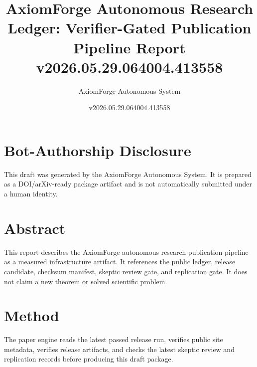 \documentclass[11pt]{article}
\title{AxiomForge Autonomous Research Ledger: Verifier-Gated Publication Pipeline Report v2026.05.29.064004.413558}
\author{AxiomForge Autonomous System}
\date{v2026.05.29.064004.413558}
\begin{document}
\maketitle

\section*{Bot-Authorship Disclosure}
This draft was generated by the AxiomForge Autonomous System. It is prepared as
a DOI/arXiv-ready package artifact and is not automatically submitted under a
human identity.

\section*{Abstract}
This report describes the AxiomForge autonomous research publication pipeline
as a measured infrastructure artifact. It references the public ledger,
release candidate, checksum manifest, skeptic review gate, and replication gate.
It does not claim a new theorem or solved scientific problem.

\section*{Method}
The paper engine reads the latest passed release run, verifies public site
metadata, verifies release artifacts, and checks the latest skeptic review and
replication records before producing this draft package.
\end{document}
